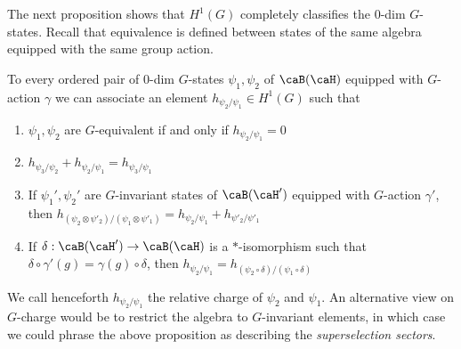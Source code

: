 The next proposition shows that $H^1(G)$ completely classifies the $0$-dim $G$-states. Recall that equivalence is defined between states of the same algebra equipped with the same group action. 
\begin{proposition}\label{prop: zerodim}
	To every ordered pair of $0$-dim $G$-states $\psi_1,\psi_2$ of $\caB(\caH)$ equipped with $G$-action $\gamma$ we can associate an element $h_{\psi_2/\psi_1} \in H^1(G)$ such that 
	\begin{enumerate}
		\item $\psi_1,\psi_2$ are $G$-equivalent if and only if  $h_{\psi_2/\psi_1}=0$
		\item $h_{\psi_3/\psi_2}+h_{\psi_2/\psi_1}=h_{\psi_3/\psi_1}$
		\item If $\psi_1',\psi_2'$ are $G$-invariant states of $\caB(\caH')$ equipped with $G$-action $\gamma'$, then $h_{(\psi_2 \otimes \psi'_2)/(\psi_1 \otimes \psi'_1)}= h_{\psi_2/\psi_1}+ h_{\psi'_2/\psi'_1}$
		\item If $\delta:\caB(\caH')\to \caB(\caH) $ is a $*$-isomorphism such that $\delta\circ\gamma'(g)=\gamma(g)\circ\delta$, then $h_{\psi_2/\psi_1}= h_{(\psi_2\circ\delta)/(\psi_1\circ\delta)}$
	\end{enumerate} 
\end{proposition}
We call henceforth $h_{\psi_2/\psi_1}$ the relative charge of $\psi_2$ and $\psi_1$. 
An alternative view on $G$-charge would be to restrict the algebra to $G$-invariant elements, in which case we could phrase the above proposition as describing the \emph{superselection sectors}.
